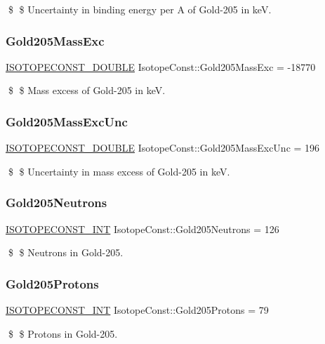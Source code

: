 \$ \$ Uncertainty in binding energy per A of Gold-\/205 in keV. \mbox{\label{group___isotope_const-_gold-_au205_ga97968104de85c0617aa85e033be67c9a}} 
\subsubsection{\texorpdfstring{Gold205\+Mass\+Exc}{Gold205MassExc}}
{\footnotesize\ttfamily \mbox{\hyperlink{group___isotope_const-_macros_ga8f45a7272ce02c0b4c65c44636ed719a}{I\+S\+O\+T\+O\+P\+E\+C\+O\+N\+S\+T\+\_\+\+D\+O\+U\+B\+LE}} Isotope\+Const\+::\+Gold205\+Mass\+Exc = -\/18770}

\$ \$ Mass excess of Gold-\/205 in keV. \mbox{\label{group___isotope_const-_gold-_au205_gafdb70b7d29be408a7b6239f39f4727a4}} 
\subsubsection{\texorpdfstring{Gold205\+Mass\+Exc\+Unc}{Gold205MassExcUnc}}
{\footnotesize\ttfamily \mbox{\hyperlink{group___isotope_const-_macros_ga8f45a7272ce02c0b4c65c44636ed719a}{I\+S\+O\+T\+O\+P\+E\+C\+O\+N\+S\+T\+\_\+\+D\+O\+U\+B\+LE}} Isotope\+Const\+::\+Gold205\+Mass\+Exc\+Unc = 196}

\$ \$ Uncertainty in mass excess of Gold-\/205 in keV. \mbox{\label{group___isotope_const-_gold-_au205_gaee00893472a971684695e1c5d121484b}} 
\subsubsection{\texorpdfstring{Gold205\+Neutrons}{Gold205Neutrons}}
{\footnotesize\ttfamily \mbox{\hyperlink{group___isotope_const-_macros_ga5f18360b3e99483a35c32d789e62621c}{I\+S\+O\+T\+O\+P\+E\+C\+O\+N\+S\+T\+\_\+\+I\+NT}} Isotope\+Const\+::\+Gold205\+Neutrons = 126}

\$ \$ Neutrons in Gold-\/205. \mbox{\label{group___isotope_const-_gold-_au205_ga723428b8bccac326300d2b6a90d0fac2}} 
\subsubsection{\texorpdfstring{Gold205\+Protons}{Gold205Protons}}
{\footnotesize\ttfamily \mbox{\hyperlink{group___isotope_const-_macros_ga5f18360b3e99483a35c32d789e62621c}{I\+S\+O\+T\+O\+P\+E\+C\+O\+N\+S\+T\+\_\+\+I\+NT}} Isotope\+Const\+::\+Gold205\+Protons = 79}

\$ \$ Protons in Gold-\/205. 
